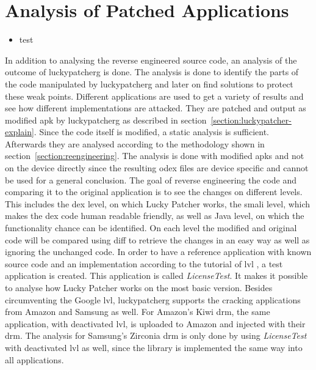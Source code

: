 \section{Analysis of Patched Applications} \label{section:luckypatcher-operation}
\begin{itemize}
    \item test
\end{itemize}
In addition to analysing the reverse engineered source code, an analysis of the outcome of \gls{luckypatcherg} is done.
The analysis is done to identify the parts of the code manipulated by \gls{luckypatcherg} and later on find solutions to protect these weak points.
Different applications are used to get a variety of results and see how different implementations are attacked.
They are patched and output as modified \gls{apk} by \gls{luckypatcherg} as described in section~\ref{section:luckypatcher-explain}.
Since the code itself is modified, a static analysis is sufficient.
Afterwards they are analysed according to the methodology shown in  section~\ref{section:reengineering}.
The analysis is done with modified \gls{apk}s and not on the device directly since the resulting \gls{odex} files are device specific and cannot be used for a general conclusion.
\newline
The goal of reverse engineering the code and comparing it to the original application is to see the changes on different levels.
This includes the \gls{dex} level, on which Lucky Patcher works, the smali level, which makes the \gls{dex} code human readable friendly, as well as Java level, on which the functionality chance can be identified.
On each level the modified and original code will be compared using diff to retrieve the changes in an easy way as well as ignoring the unchanged code.
\newline
In order to have a reference application with known source code and an implementation according to the tutorial of \gls{lvl} \cite{developersLicensingAdding}, a test application is created.
This application is called \textit{LicenseTest}.
It makes it possible to analyse how Lucky Patcher works on the most basic version.
Besides circumventing the Google \gls{lvl}, \gls{luckypatcherg} supports the cracking applications from Amazon and Samsung as well.
For Amazon's Kiwi \gls{drm}, the same application, with deactivated \gls{lvl}, is uploaded to Amazon and injected with their \gls{drm}.
The analysis for Samsung’s Zirconia \gls{drm} is only done by using \textit{LicenseTest} with deactivated \gls{lvl} as well, since the library is implemented the same way into all applications.
